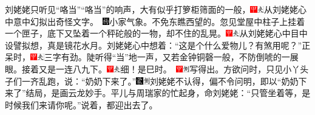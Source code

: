刘姥姥只听见“咯当”“咯当”的响声，大有似乎打箩柜筛面的一般，{{\includegraphics[width=3mm]{../Images/00002}\includegraphics[width=3mm]{../Images/00012}\footnotesize \kaishu 从刘姥姥心中意中幻拟出奇怪文字。　}\includegraphics[width=3mm]{../Images/00008}\footnotesize \kaishu 小家气象。}不免东瞧西望的。忽见堂屋中柱子上挂着一个匣子，底下又坠着一个秤砣般的一物，却不住的乱晃。{\includegraphics[width=3mm]{../Images/00002}\includegraphics[width=3mm]{../Images/00012}\footnotesize \kaishu 从刘姥姥心中目中设譬拟想，真是镜花水月。}刘姥姥心中想着：“这是个什么爱物儿？有煞用呢？”正呆时，{\includegraphics[width=3mm]{../Images/00002}\includegraphics[width=3mm]{../Images/00012}\footnotesize \kaishu 三字有劲。}陡听得“当”地一声，又若金钟铜磬一般，不防倒唬的一展眼。接着又是一连八九下。{\includegraphics[width=3mm]{../Images/00002}\includegraphics[width=3mm]{../Images/00012}\footnotesize \kaishu 细！是巳时。　\includegraphics[width=3mm]{../Images/00002}\includegraphics[width=3mm]{../Images/00011}\footnotesize \kaishu 写得出。}方欲问时，只见小丫头子们一齐乱跑，说：“奶奶下来了。”{\includegraphics[width=3mm]{../Images/00006}\includegraphics[width=3mm]{../Images/00011}\footnotesize \kaishu 刘姥姥不认得，偏不令问明，即以“奶奶下来了”结局，是画云龙妙手。}平儿与周瑞家的忙起身，命刘姥姥：“只管坐着等，是时候我们来请你呢。”说着，都迎出去了。

